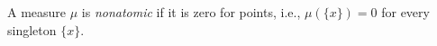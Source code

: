 A measure $\mu$ is \textit{nonatomic} if it is zero for points, i.e., $\mu(\{x\}) = 0$ for every singleton $\{x\}$.
